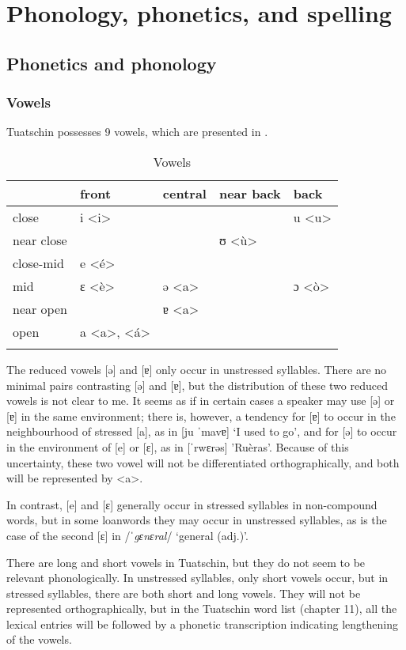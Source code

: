 \chapter{Phonology, phonetics, and spelling}

\section{Phonetics and phonology}

\subsection{Vowels}
Tuatschin possesses 9 vowels, which are presented in .

\begin{table}
\caption{Vowels}
\label{vow}
 \begin{tabular}{lllll}
  \lsptoprule
            &  front& central  & near back & back \\
  \midrule
 close   &  i <i>  &      &   &    u <u>\\
 near close    &   &      & ʊ <ù> &  \\
close-mid    &  e <é> &   &  &       \\
mid    & ɛ <è>  & ə <a> &        & ɔ <ò>\\
near open    &    &  ɐ <a>  &        \\
open    &   a <a>, <á> & \\
  \lspbottomrule
 \end{tabular}
\end{table}

The reduced vowels [ə] and [ɐ] only occur in unstressed syllables. There are no minimal pairs contrasting [ə] and [ɐ], but the distribution of these two reduced vowels is not clear to me. It seems as if in certain cases a speaker may use [ə] or [ɐ] in the same environment; there is, however, a tendency for [ɐ] to occur in the neighbourhood of stressed [a], as in [ju ˈmavɐ] `I used to go', and for [ə] to occur in the environment of [e] or [ɛ], as in [ˈrwɛrəs] 'Ruèras'. Because of this uncertainty, these two vowel will not be differentiated orthographically, and both will be represented by <a>.

In contrast, [e] and [ɛ] generally occur in stressed syllables in non-compound words, but in some loanwords they may occur in unstressed syllables, as is the case of the second [ɛ] in /\textit{ˈgɛnɛral}/ `general (adj.)'.

There are long and short vowels in Tuatschin, but they do not seem to be relevant phonologically. In unstressed syllables, only short vowels occur, but in stressed syllables, there are both short and long vowels. They will not be represented orthographically, but in the Tuatschin word list (chapter 11), all the lexical entries will be followed by a phonetic transcription indicating lengthening of the vowels.


